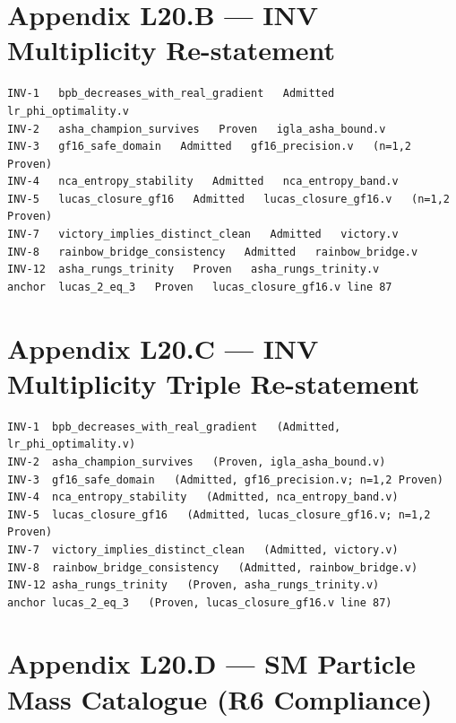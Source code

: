 \section{Appendix L20.B — INV Multiplicity Re-statement}
\label{sec:l20-appendix-B}

\begin{verbatim}
INV-1   bpb_decreases_with_real_gradient   Admitted   lr_phi_optimality.v
INV-2   asha_champion_survives   Proven   igla_asha_bound.v
INV-3   gf16_safe_domain   Admitted   gf16_precision.v   (n=1,2 Proven)
INV-4   nca_entropy_stability   Admitted   nca_entropy_band.v
INV-5   lucas_closure_gf16   Admitted   lucas_closure_gf16.v   (n=1,2 Proven)
INV-7   victory_implies_distinct_clean   Admitted   victory.v
INV-8   rainbow_bridge_consistency   Admitted   rainbow_bridge.v
INV-12  asha_rungs_trinity   Proven   asha_rungs_trinity.v
anchor  lucas_2_eq_3   Proven   lucas_closure_gf16.v line 87
\end{verbatim}

\section{Appendix L20.C — INV Multiplicity Triple Re-statement}
\label{sec:l20-appendix-C}

\begin{verbatim}
INV-1  bpb_decreases_with_real_gradient   (Admitted, lr_phi_optimality.v)
INV-2  asha_champion_survives   (Proven, igla_asha_bound.v)
INV-3  gf16_safe_domain   (Admitted, gf16_precision.v; n=1,2 Proven)
INV-4  nca_entropy_stability   (Admitted, nca_entropy_band.v)
INV-5  lucas_closure_gf16   (Admitted, lucas_closure_gf16.v; n=1,2 Proven)
INV-7  victory_implies_distinct_clean   (Admitted, victory.v)
INV-8  rainbow_bridge_consistency   (Admitted, rainbow_bridge.v)
INV-12 asha_rungs_trinity   (Proven, asha_rungs_trinity.v)
anchor lucas_2_eq_3   (Proven, lucas_closure_gf16.v line 87)
\end{verbatim}

\section{Appendix L20.D — SM Particle Mass Catalogue (R6 Compliance)}
\label{sec:l20-appendix-D}

